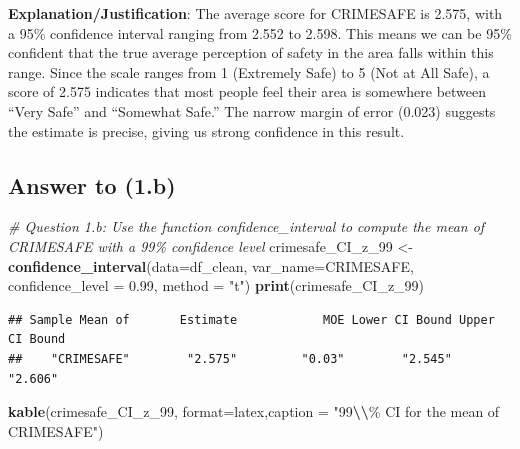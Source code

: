 \documentclass[
  11pt,
]{article}
\newenvironment{Shaded}{\begin{snugshade}}{\end{snugshade}}
\newcommand{\AttributeTok}[1]{\textcolor[rgb]{0.13,0.29,0.53}{#1}}
\newcommand{\CommentTok}[1]{\textcolor[rgb]{0.56,0.35,0.01}{\textit{#1}}}
\newcommand{\FloatTok}[1]{\textcolor[rgb]{0.00,0.00,0.81}{#1}}
\newcommand{\FunctionTok}[1]{\textcolor[rgb]{0.13,0.29,0.53}{\textbf{#1}}}
\newcommand{\NormalTok}[1]{#1}
\newcommand{\OtherTok}[1]{\textcolor[rgb]{0.56,0.35,0.01}{#1}}
\newcommand{\SpecialCharTok}[1]{\textcolor[rgb]{0.81,0.36,0.00}{\textbf{#1}}}
\newcommand{\StringTok}[1]{\textcolor[rgb]{0.31,0.60,0.02}{#1}}
\begin{document}
\textbf{Explanation/Justification}: The average score for CRIMESAFE is
2.575, with a 95\% confidence interval ranging from 2.552 to 2.598. This
means we can be 95\% confident that the true average perception of
safety in the area falls within this range. Since the scale ranges from
1 (Extremely Safe) to 5 (Not at All Safe), a score of 2.575 indicates
that most people feel their area is somewhere between ``Very Safe'' and
``Somewhat Safe.'' The narrow margin of error (0.023) suggests the
estimate is precise, giving us strong confidence in this result.

\subsection{Answer to (1.b)}\label{answer-to-1.b}

\begin{Shaded}
\begin{Highlighting}[]
\CommentTok{\# Question 1.b: Use the function \textasciigrave{}confidence\_interval\textasciigrave{} to compute the mean of \textasciigrave{}CRIMESAFE\textasciigrave{} with a 99\% confidence level}
\NormalTok{crimesafe\_CI\_z\_99 }\OtherTok{\textless{}{-}} \FunctionTok{confidence\_interval}\NormalTok{(}\AttributeTok{data=}\NormalTok{df\_clean, }
                                         \AttributeTok{var\_name=}\StringTok{\textquotesingle{}CRIMESAFE\textquotesingle{}}\NormalTok{, }
                                         \AttributeTok{confidence\_level =} \FloatTok{0.99}\NormalTok{, }\AttributeTok{method =} \StringTok{"t"}\NormalTok{)}
\FunctionTok{print}\NormalTok{(crimesafe\_CI\_z\_99)}
\end{Highlighting}
\end{Shaded}

\begin{verbatim}
## Sample Mean of       Estimate            MOE Lower CI Bound Upper CI Bound 
##    "CRIMESAFE"        "2.575"         "0.03"        "2.545"        "2.606"
\end{verbatim}

\begin{Shaded}
\begin{Highlighting}[]
\FunctionTok{kable}\NormalTok{(crimesafe\_CI\_z\_99, }\AttributeTok{format=}\StringTok{\textquotesingle{}latex\textquotesingle{}}\NormalTok{,}\AttributeTok{caption =} \StringTok{"99}\SpecialCharTok{\textbackslash{}\textbackslash{}}\StringTok{\% CI for the mean of \textasciigrave{}CRIMESAFE\textasciigrave{}"}\NormalTok{)}
\end{Highlighting}
\end{Shaded}
\end{document}
